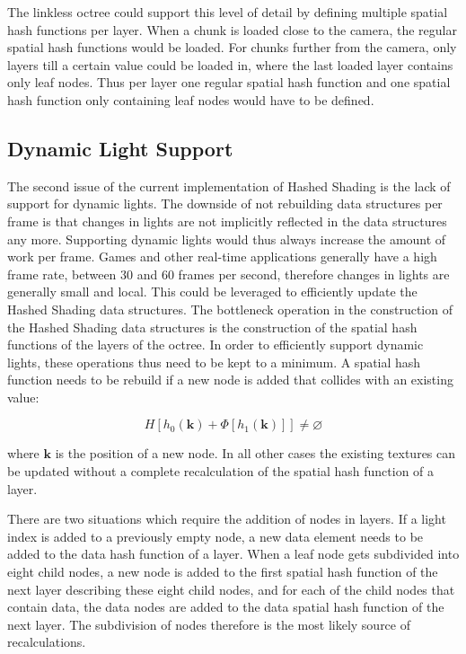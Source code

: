 The linkless octree could support this level of detail by defining multiple spatial hash functions
per layer. When a chunk is loaded close to the camera, the regular spatial hash functions would
be loaded. For chunks further from the camera, only layers till a certain value could be loaded
in, where the last loaded layer contains only leaf nodes. Thus per layer one regular spatial hash function
and one spatial hash function only containing leaf nodes would have to be defined.

\subsection{Dynamic Light Support}

The second issue of the current implementation of Hashed Shading is the lack of support for
dynamic lights. The downside of not rebuilding data structures per frame is that changes
in lights are not implicitly reflected in the data structures any more. Supporting dynamic
lights would thus always increase the amount of work per frame.
Games and other real-time applications generally have a high frame rate, between 30 and 60 frames
per second, therefore changes in lights are generally small and local. This could be leveraged
to efficiently update the Hashed Shading data structures.
The bottleneck operation in the construction of the Hashed Shading data structures is the construction of the
spatial hash functions of the layers of the octree. In order to efficiently support dynamic lights,
these operations thus need to be kept to a minimum. A spatial hash function needs to be rebuild if
a new node is added that collides with an existing value:

\begin{equation*}
    H\left[ \mathit{h}_0\left(\mathbf{k}\right) + \Phi\left[ \mathit{h}_1\left(\mathbf{k}\right) \right] \right] \neq \varnothing 
\end{equation*}

\noindent where $\mathbf{k}$ is the position of a new node. In all other cases the existing
textures can be updated without a complete recalculation of the spatial hash function of a layer.

There are two situations which require the addition of nodes in layers. If a light index is added
to a previously empty node, a new data element needs to be added to the data hash function of a layer.
When a leaf node gets subdivided into eight child nodes, a new node is added to the first
spatial hash function of the next layer describing these eight child nodes, and for each of the child
nodes that contain data, the data nodes are added to the data spatial hash function of the next layer.
The subdivision of nodes therefore is the most likely source of recalculations.

